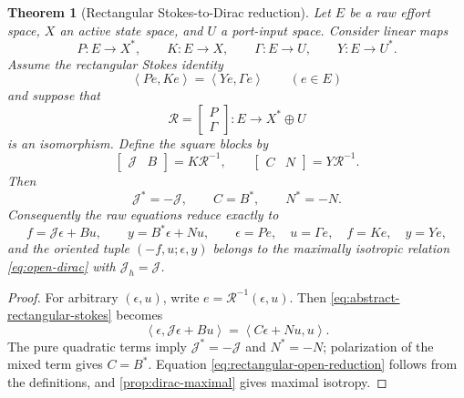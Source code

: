 \documentclass[11pt,a4paper]{article}
\newtheorem{theorem}{Theorem}[section]
\newcommand{\ip}[2]{\left\langle #1,#2\right\rangle}
\begin{document}
\begin{theorem}[Rectangular Stokes-to-Dirac reduction]
\label{thm:rectangular-stokes-dirac}
Let \(E\) be a raw effort space, \(X\) an active state space, and \(U\)
a port-input space.  Consider linear maps
\[
 P:E\to X^*,\qquad K:E\to X,\qquad
 \Gamma:E\to U,\qquad Y:E\to U^*.
\]
Assume the rectangular Stokes identity
\begin{equation}\label{eq:abstract-rectangular-stokes}
 \ip{Pe}{Ke}=\ip{Ye}{\Gamma e}
 \qquad(e\in E)
\end{equation}
and suppose that
\begin{equation}\label{eq:effort-input-reconstruction}
 \mathcal R=\begin{bmatrix}P\\\Gamma\end{bmatrix}:
 E\longrightarrow X^*\oplus U
\end{equation}
is an isomorphism.  Define the square blocks by
\begin{equation}\label{eq:rectangular-square-blocks}
 \begin{bmatrix}\mathcal J&B\end{bmatrix}=K\mathcal R^{-1},
 \qquad
 \begin{bmatrix}C&N\end{bmatrix}=Y\mathcal R^{-1}.
\end{equation}
Then
\begin{equation}\label{eq:rectangular-dirac-identities}
 \mathcal J^*=-\mathcal J,\qquad C=B^*,\qquad N^*=-N.
\end{equation}
Consequently the raw equations reduce exactly to
\begin{equation}\label{eq:rectangular-open-reduction}
 f=\mathcal J\epsilon+Bu,\qquad
 y=B^*\epsilon+Nu,\qquad
 \epsilon=Pe,\quad u=\Gamma e,\quad f=Ke,\quad y=Ye,
\end{equation}
and the oriented tuple \((-f,u;\epsilon,y)\) belongs to the maximally
isotropic relation \cref{eq:open-dirac} with
\(\mathcal J_h=\mathcal J\).
\end{theorem}

\begin{proof}
For arbitrary \((\epsilon,u)\), write
\(e=\mathcal R^{-1}(\epsilon,u)\).  Then
\cref{eq:abstract-rectangular-stokes} becomes
\[
 \ip{\epsilon}{\mathcal J\epsilon+Bu}
 =\ip{C\epsilon+Nu}{u}.
\]
The pure quadratic terms imply \(\mathcal J^*=-\mathcal J\) and
\(N^*=-N\); polarization of the mixed term gives \(C=B^*\).
Equation \cref{eq:rectangular-open-reduction} follows from the definitions,
and \cref{prop:dirac-maximal} gives maximal isotropy.
\end{proof}
\end{document}
